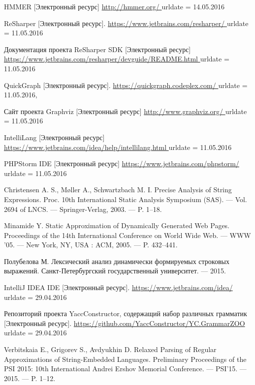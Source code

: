 \begin{thebibliography}{99}
  HMMER [Электронный ресурс]
  \url{http://hmmer.org/ }
  urldate = {14.05.2016}

  ReSharper [Электронный ресурс].
  \url{https://www.jetbrains.com/resharper/ }
  urldate = {11.05.2016}

  Документация проекта ReSharper SDK [Электронный ресурс]
  \url{ https://www.jetbrains.com/resharper/devguide/README.html }
  urldate = {11.05.2016}

  QuickGraph [Электронный ресурс].
  \url{ https://quickgraph.codeplex.com/ }
  urldate = {11.05.2016},

  Сайт проекта Graphviz [Электронный ресурс]
  \url{ http://www.graphviz.org/ }
  urldate = {11.05.2016}
    
  IntelliLang [Электронный ресурс]
  \url{ https://www.jetbrains.com/idea/help/intellilang.html }
  urldate = {11.05.2016}
                        
  PHPStorm IDE [Электронный ресурс]
  \url{ https://www.jetbrains.com/phpstorm/ }
  urldate = {11.05.2016}
                                             
  Christensen A. S., M{\o}ller A., Schwartzbach M. I.
  Precise Analysis of String Expressions.
   Proc. 10th International Static Analysis Symposium (SAS). –– Vol. 2694 of LNCS. –– Springer-Verlag, 2003. –– P. 1–18.

  Minamide Y. 
  Static Approximation of Dynamically Generated Web Pages.
  Proceedings of the 14th International Conference on World Wide Web. –– WWW ’05. –– New York, NY, USA : ACM, 2005. –– P. 432–441.
                                         
  Полубелова М. 
  Лексический анализ динамически формируемых строковых выражений.
  Санкт-Петербургский государственный университет. –– 2015.
  
  IntelliJ IDEA IDE [Электронный ресурс].
  \url{https://www.jetbrains.com/idea/}
  urldate = {29.04.2016}

  Репозиторий проекта YaccConstructor, содержащий набор различных грамматик [Электронный ресурс].
  \url{https://github.com/YaccConstructor/YC.GrammarZOO}
  urldate = {29.04.2016}

  Verbitskaia E., Grigorev S., Avdyukhin D. 
  Relaxed Parsing of Regular Approximations of String-Embedded Languages.
  Preliminary Proceedings of the PSI 2015: 10th International Andrei Ershov Memorial Conference. –– PSI’15. –– 2015. –– P. 1–12.


\end{thebibliography}
